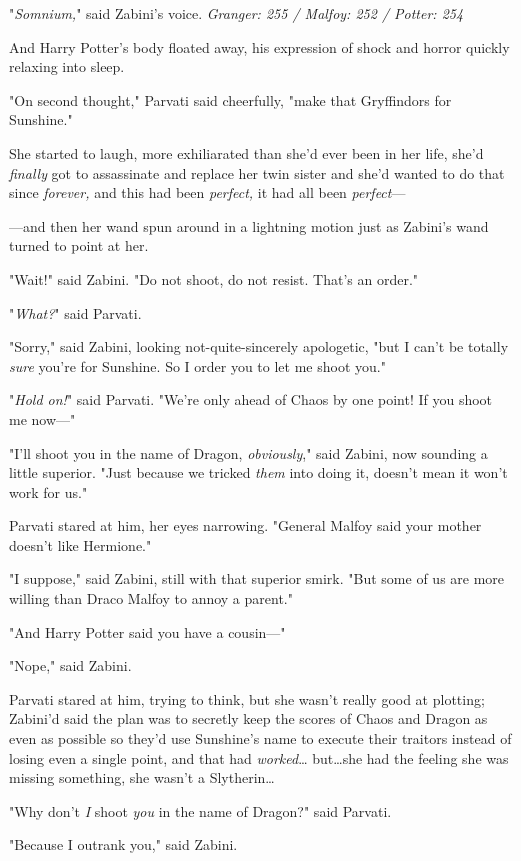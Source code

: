 "\emph{Somnium,}" said Zabini's voice.
\later
\emph{Granger: 255 / Malfoy: 252 / Potter: 254}

And Harry Potter's body floated away, his expression of shock and horror
quickly relaxing into sleep.

"On second thought," Parvati said cheerfully, "make that Gryffindors for
Sunshine."

She started to laugh, more exhiliarated than she'd ever been in her life, she'd
\emph{finally} got to assassinate and replace her twin sister and she'd
wanted to do that since \emph{forever,} and this had been \emph{perfect,} it
had all been \emph{perfect}---

---and then her wand spun around in a lightning motion just as Zabini's wand
turned to point at her.

"Wait!" said Zabini. "Do not shoot, do not resist. That's an order."

"\emph{What?}" said Parvati.

"Sorry," said Zabini, looking not-quite-sincerely apologetic, "but I can't be
totally \emph{sure} you're for Sunshine. So I order you to let me shoot you."

"\emph{Hold on!}" said Parvati. "We're only ahead of Chaos by one point! If you
shoot me now---"

"I'll shoot you in the name of Dragon, \emph{obviously}," said Zabini, now
sounding a little superior. "Just because we tricked \emph{them} into doing it,
doesn't mean it won't work for us."

Parvati stared at him, her eyes narrowing. "General Malfoy said your mother
doesn't like Hermione."

"I suppose," said Zabini, still with that superior smirk. "But some of us are
more willing than Draco Malfoy to annoy a parent."

"And Harry Potter said you have a cousin---"

"Nope," said Zabini.

Parvati stared at him, trying to think, but she wasn't really good at plotting;
Zabini'd said the plan was to secretly keep the scores of Chaos and Dragon as
even as possible so they'd use Sunshine's name to execute their traitors
instead of losing even a single point, and that had \emph{worked}…
but…she had the feeling she was missing something, she wasn't a
Slytherin…

"Why don't \emph{I} shoot \emph{you} in the name of Dragon?" said Parvati.

"Because I outrank you," said Zabini.

